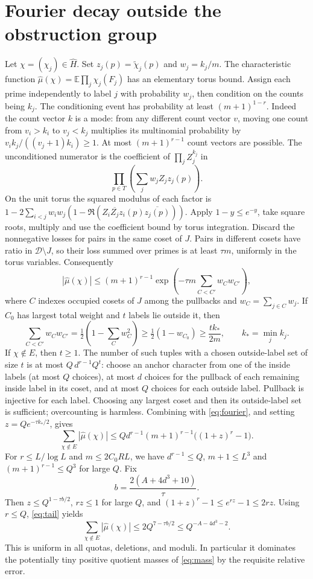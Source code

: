 \documentclass[11pt]{article}
\theoremstyle{remark}\newtheorem{remark}[theorem]{Remark}
\newcommand{\E}{\mathbb E}
\begin{document}
\section{Fourier decay outside the obstruction group}
Let $\chi=(\chi_j)\in\widehat H$. Set $z_j(p)=\widetilde\chi_j(p)$ and $w_j=k_j/m$. The characteristic function $\widehat\mu(\chi)=\E\prod_{j}\chi_j(F_j)$ has an elementary torus bound. Assign each prime independently to label $j$ with probability $w_j$, then condition on the counts being $k_j$. The conditioning event has probability at least $(m+1)^{1-r}$. Indeed the count vector $k$ is a mode: from any different count vector $v$, moving one count from $v_i>k_i$ to $v_j<k_j$ multiplies its multinomial probability by $v_i k_j/((v_j+1)k_i)\ge1$. At most $(m+1)^{r-1}$ count vectors are possible. The unconditioned numerator is the coefficient of $\prod_j Z_j^{k_j}$ in
\[
\prod_{p\in T}\left(\sum_j w_j Z_j z_j(p)\right).
\]
On the unit torus the squared modulus of each factor is $1-2\sum_{i<j}w_iw_j(1-\Re(Z_i\overline{Z_j}z_i(p)\overline{z_j(p)}))$. Apply $1-y\le e^{-y}$, take square roots, multiply and use the coefficient bound by torus integration. Discard the nonnegative losses for pairs in the same coset of $J$. Pairs in different cosets have ratio in $\mathcal D\setminus J$, so their loss summed over primes is at least $\tau m$, uniformly in the torus variables. Consequently
\begin{equation}\label{eq:fourier}
|\widehat\mu(\chi)|\le(m+1)^{r-1}\exp\left(-\tau m\sum_{C<C'}w_Cw_{C'}\right),
\end{equation}
where $C$ indexes occupied cosets of $J$ among the pullbacks and $w_C=\sum_{j\in C}w_j$. If $C_0$ has largest total weight and $t$ labels lie outside it, then
\[
\sum_{C<C'}w_Cw_{C'}=\tfrac12(1-\sum_Cw_C^2)\ge\tfrac12(1-w_{C_0})\ge \frac{tk_*}{2m},
\qquad k_*=\min_jk_j.
\]
If $\chi\notin E$, then $t\ge1$. The number of such tuples with a chosen outside-label set of size $t$ is at most $Q\,d^{r-1}Q^t$: choose an anchor character from one of the inside labels (at most $Q$ choices), at most $d$ choices for the pullback of each remaining inside label in its coset, and at most $Q$ choices for each outside label. Pullback is injective for each label. Choosing any largest coset and then its outside-label set is sufficient; overcounting is harmless. Combining with \eqref{eq:fourier}, and setting $z=Qe^{-\tau k_*/2}$, gives
\begin{equation}\label{eq:tail}
\sum_{\chi\notin E}|\widehat\mu(\chi)|\le Qd^{r-1}(m+1)^{r-1}\bigl((1+z)^r-1\bigr).
\end{equation}
For $r\le L/\log L$ and $m\le 2C_0RL$, we have $d^{r-1}\le Q$, $m+1\le L^3$ and $(m+1)^{r-1}\le Q^3$ for large $Q$. Fix
\[
b=\frac{2(A+4d^3+10)}{\tau}.
\]
Then $z\le Q^{1-\tau b/2}$, $rz\le1$ for large $Q$, and $(1+z)^r-1\le e^{rz}-1\le2rz$. Using $r\le Q$, \eqref{eq:tail} yields
\begin{equation}\label{eq:tailsmall}
\sum_{\chi\notin E}|\widehat\mu(\chi)|\le 2Q^{7-\tau b/2}\le Q^{-A-4d^3-2}.
\end{equation}
This is uniform in all quotas, deletions, and moduli. In particular it dominates the potentially tiny positive quotient masses of \eqref{eq:mass} by the requisite relative error.
\end{document}
